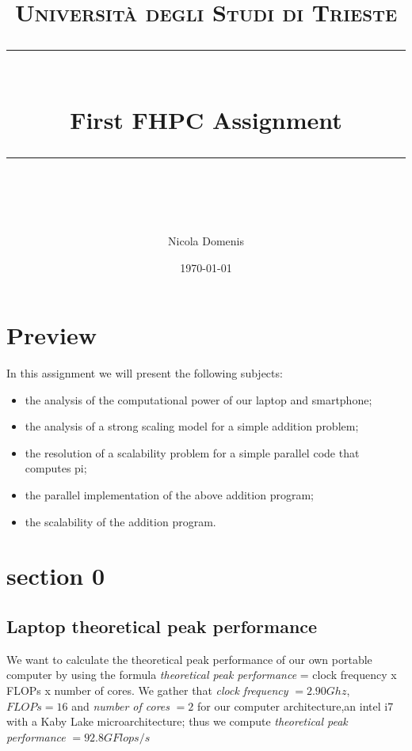 \documentclass[11pt]{scrartcl} %
\title{	
	\normalfont\normalsize
	\textsc{Università degli Studi di Trieste}\\ %
	\vspace{25pt} %
	\rule{\linewidth}{0.5pt}\\ %
	\vspace{20pt} %
	{\huge First FHPC Assignment}\\ %
	\vspace{12pt} %
	\rule{\linewidth}{2pt}\\ %
	\vspace{12pt} %
}
\author{\LARGE Nicola Domenis} %
\date{\normalsize\today} %
\begin{document}
\maketitle %


\section{Preview}
 
In this assignment we will present the following subjects:

\begin{itemize}
	\item the analysis of the computational power of our laptop and smartphone;
	\item the analysis of a strong scaling model for a simple addition problem;
	\item the resolution of a scalability problem for a simple parallel code that computes pi;
	\item the parallel implementation of the above addition program;
	\item the scalability of the addition program.
\end{itemize}


\section{section 0}
\subsection{Laptop theoretical peak performance}

We want to calculate the theoretical peak performance of our own portable computer by using the formula \textit{theoretical peak performance} = clock frequency x FLOPs x number of cores.
We gather that \textit{clock frequency} $= 2.90 Ghz$,$ FLOPs = 16$ and \textit{number of cores} $= 2$ for our computer architecture,an intel i7 with a Kaby Lake microarchitecture; thus we compute \textit{theoretical peak performance} $= 92.8 GFlops/s$
%
\end{document}

